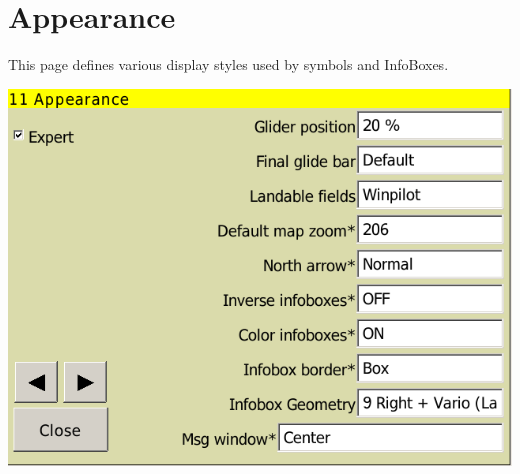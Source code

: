 \documentclass[a4paper,12pt]{refrep}
\begin{document}
\clearpage
\section{Appearance}

This page defines various display styles used by symbols and InfoBoxes.

\begin{center}
\includegraphics[angle=0,width=\linewidth,keepaspectratio='true']{figures/config-9.png}
\end{center}
\end{document}
